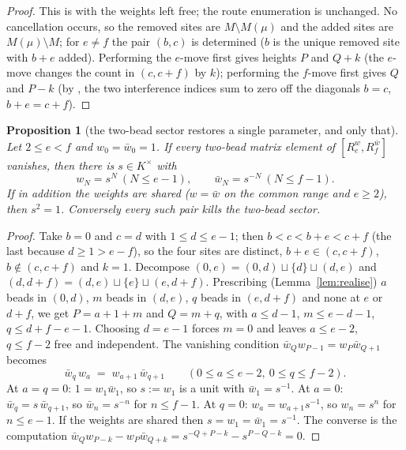 \documentclass[11pt]{article}
\newtheorem{proposition}[theorem]{Proposition}
\theoremstyle{definition}
\begin{document}
\begin{proof}
This is \cite[Thm.~5(2)]{Clio0907} with the weights left free; the route enumeration is
unchanged.  No cancellation occurs, so the removed sites are $M\setminus M(\mu)$ and the
added sites are $M(\mu)\setminus M$; for $e\ne f$ the pair $(b,c)$ is determined ($b$ is
the unique removed site with $b+e$ added).  Performing the $e$-move first gives heights
$P$ and $Q+k$ (the $e$-move changes the count in $(c,c+f)$ by $k$); performing the
$f$-move first gives $Q$ and $P-k$ (by \cite[Lem.~4]{Clio0907}, the two interference
indices sum to zero off the diagonals $b=c$, $b+e=c+f$).
\end{proof}

\begin{proposition}[the two-bead sector restores a single parameter, and only that]
\label{prop:twobead}
Let $2\le e<f$ and $w_0=\bar w_0=1$.  If every two-bead matrix element of
$[R_e^{w},R_f^{\bar w}]$ vanishes, then there is $s\in K^{\times}$ with
\[
   w_N=s^{N}\ (N\le e-1),\qquad \bar w_N=s^{-N}\ (N\le f-1).
\]
If in addition the weights are shared ($w=\bar w$ on the common range and $e\ge2$), then
$s^2=1$.  Conversely every such pair kills the two-bead sector.
\end{proposition}

\begin{proof}
Take $b=0$ and $c=d$ with $1\le d\le e-1$; then $b<c<b+e<c+f$ (the last because
$d\ge1>e-f$), so the four sites are distinct, $b+e\in(c,c+f)$, $b\notin(c,c+f)$ and
$k=1$.  Decompose $(0,e)=(0,d)\sqcup\{d\}\sqcup(d,e)$ and
$(d,d+f)=(d,e)\sqcup\{e\}\sqcup(e,d+f)$.  Prescribing (Lemma~\ref{lem:realise}) $a$
beads in $(0,d)$, $m$ beads in $(d,e)$, $q$ beads in $(e,d+f)$ and none at $e$ or $d+f$,
we get $P=a+1+m$ and $Q=m+q$, with $a\le d-1$, $m\le e-d-1$, $q\le d+f-e-1$.  Choosing
$d=e-1$ forces $m=0$ and leaves $a\le e-2$, $q\le f-2$ free and independent.  The
vanishing condition $\bar w_Qw_{P-1}=w_P\bar w_{Q+1}$ becomes
\[
   \bar w_{q}\,w_{a}\;=\;w_{a+1}\,\bar w_{q+1}\qquad(0\le a\le e-2,\ 0\le q\le f-2).
\]
At $a=q=0$: $1=w_1\bar w_1$, so $s:=w_1$ is a unit with $\bar w_1=s^{-1}$.  At $a=0$:
$\bar w_q=s\,\bar w_{q+1}$, so $\bar w_n=s^{-n}$ for $n\le f-1$.  At $q=0$:
$w_a=w_{a+1}s^{-1}$, so $w_n=s^{n}$ for $n\le e-1$.  If the weights are shared then
$s=w_1=\bar w_1=s^{-1}$.  The converse is the computation
$\bar w_Qw_{P-k}-w_P\bar w_{Q+k}=s^{-Q+P-k}-s^{P-Q-k}=0$.
\end{proof}
\end{document}
